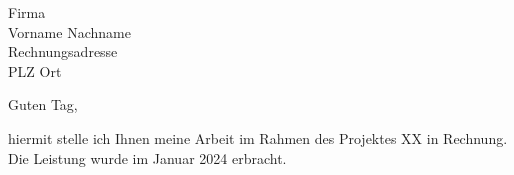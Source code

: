 \documentclass[parskip=half-,german]{scrartcl}
\begin{document}
\begin{letter}{Firma\\Vorname Nachname\\Rechnungsadresse\\PLZ Ort}
	
\opening{Guten Tag,}

hiermit stelle ich Ihnen meine Arbeit im Rahmen des Projektes XX in Rechnung. Die Leistung wurde im Januar 2024 erbracht. 



\PrintInvoiceTabular

\end{letter}
\end{document}
